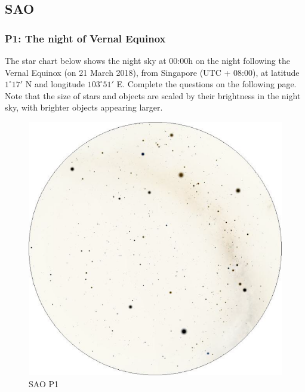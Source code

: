 \documentclass[a4paper,12pt]{extarticle}
\begin{document}
\subsection{SAO}
\subsubsection{P1: The night of Vernal Equinox}
The star chart below shows the night sky at 00:00h on the night following the Vernal Equinox (on 21 March 2018), from Singapore (UTC + 08:00), at latitude $1^\circ17'$ N and longitude $103^\circ51'$ E. Complete the questions on the following page. Note that the size of stars and objects are scaled by their brightness in the night sky, with brighter objects appearing larger.
\begin{figure}[H]
	\centering
	\includegraphics[width=0.9\linewidth]{SAO_1.png}
	\caption{SAO P1}
\end{figure}
\end{document}
